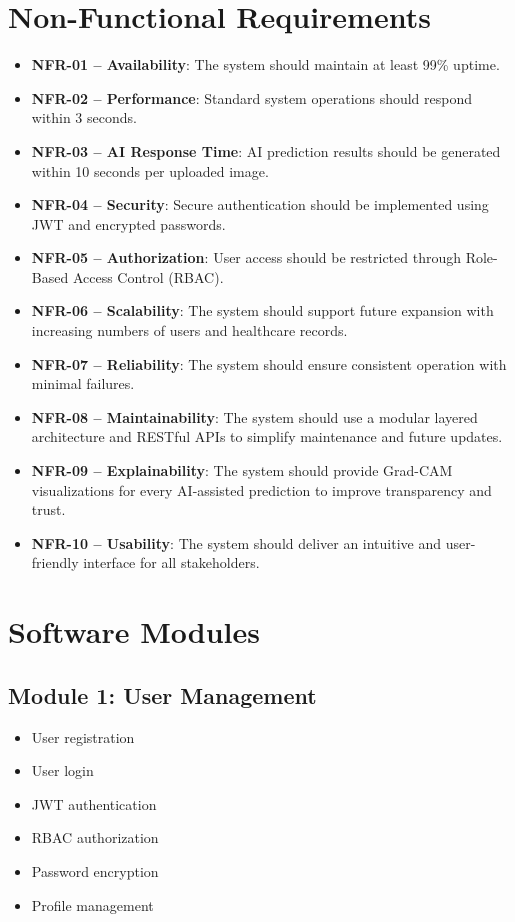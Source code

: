 \documentclass[12pt,a4paper]{report}
\begin{document}
\section{Non-Functional Requirements}

\begin{itemize}[noitemsep]
    \item \textbf{NFR-01 -- Availability}: The system should maintain at least 99\% uptime.
    \item \textbf{NFR-02 -- Performance}: Standard system operations should respond within 3 seconds.
    \item \textbf{NFR-03 -- AI Response Time}: AI prediction results should be generated within 10 seconds per uploaded image.
    \item \textbf{NFR-04 -- Security}: Secure authentication should be implemented using JWT and encrypted passwords.
    \item \textbf{NFR-05 -- Authorization}: User access should be restricted through Role-Based Access Control (RBAC).
    \item \textbf{NFR-06 -- Scalability}: The system should support future expansion with increasing numbers of users and healthcare records.
    \item \textbf{NFR-07 -- Reliability}: The system should ensure consistent operation with minimal failures.
    \item \textbf{NFR-08 -- Maintainability}: The system should use a modular layered architecture and RESTful APIs to simplify maintenance and future updates.
    \item \textbf{NFR-09 -- Explainability}: The system should provide Grad-CAM visualizations for every AI-assisted prediction to improve transparency and trust.
    \item \textbf{NFR-10 -- Usability}: The system should deliver an intuitive and user-friendly interface for all stakeholders.
\end{itemize}

\section{Software Modules}

\subsection*{Module 1: User Management}
\begin{itemize}[noitemsep]
    \item User registration \item User login \item JWT authentication \item RBAC authorization \item Password encryption \item Profile management
\end{itemize}
\end{document}
